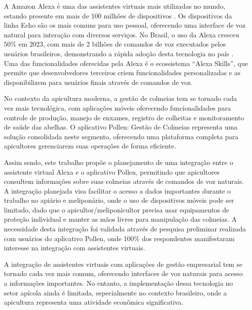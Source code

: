 \label{cap:introducao}

A Amazon Alexa é uma das assistentes virtuais mais utilizadas no mundo, estando presente em mais de 100 milhões de dispositivos \cite{amazon2019alexa100m}.
Os dispositivos da linha Echo são os mais comuns para uso pessoal, oferecendo uma interface de voz natural para interação com diversos serviços. 
No Brasil, o uso da Alexa cresceu 50\% em 2023, com mais de 2 bilhões de comandos de voz executados pelos usuários brasileiros, 
demonstrando a rápida adoção desta tecnologia no país \cite{forbes2024}. Uma das funcionalidades oferecidas pela Alexa é o ecossistema ``Alexa Skills'', 
que permite que desenvolvedores terceiros criem funcionalidades personalizadas e as disponibilizem para usuários finais através de comandos de voz.

No contexto da apicultura moderna, a gestão de colmeias tem se tornado cada vez mais tecnológica, com aplicações móveis oferecendo funcionalidades 
para controle de produção, manejo de enxames, registro de colheitas e monitoramento de saúde das abelhas. 
O aplicativo Pollen: Gestão de Colmeias representa uma solução consolidada neste segmento, oferecendo uma plataforma completa para apicultores 
gerenciarem suas operações de forma eficiente.

Assim sendo, este trabalho propõe o planejamento de uma integração entre o assistente virtual Alexa e o aplicativo Pollen, 
permitindo que apicultores consultem informações sobre suas colmeias através de comandos de voz naturais. 
A integração planejada visa facilitar o acesso a dados importantes durante o trabalho no apiário e meliponário, onde o uso de dispositivos móveis pode ser limitado, dado que o apicultor/meliponicultor precisa usar equipamentos de proteção individual e manter as mãos livres para manipulação das colmeias.
A necessidade desta integração foi validada através de pesquisa preliminar realizada com usuários do aplicativo Pollen, onde 100\% dos respondentes manifestaram interesse na integração com assistentes virtuais.


\label{sec:problema-pesquisa-justificativa}

A integração de assistentes virtuais com aplicações de gestão empresarial tem se tornado cada vez mais comum, 
oferecendo interfaces de voz naturais para acesso a informações importantes. No entanto, a implementação dessa tecnologia no setor apícola 
ainda é limitada, especialmente no contexto brasileiro, onde a apicultura representa uma atividade econômica significativa.

